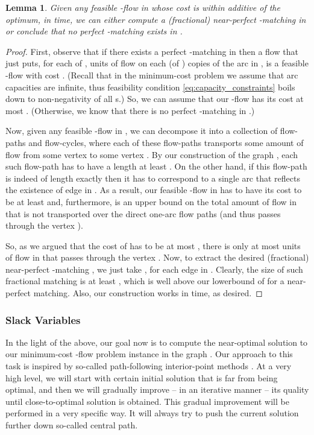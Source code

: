 \documentclass[11pt, letterpaper]{article}
\newtheorem{lemma}[theorem]{Lemma}
\begin{document}
\begin{lemma}\label{lem:mincost_to_matchings}
Given any feasible -flow  in  whose cost  is within additive  of the optimum, in  time, we can either compute a (fractional) near-perfect -matching  in  or conclude that no perfect -matching exists in . 
\end{lemma} 

\begin{proof}
First, observe that if there exists a perfect -matching  in  then a flow  that just puts, for each  of ,  units of flow on each (of ) copies of the arc  in , is a feasible -flow with cost . (Recall that in the minimum-cost problem we assume that arc capacities are infinite, thus feasibility condition \eqref{eq:capacity_constraints} boils down to non-negativity of all s.) So, we can assume that our -flow  has its cost  at most . (Otherwise, we know that there is no perfect -matching in .)

Now, given any feasible -flow in , we can decompose it into a collection of flow-paths and flow-cycles, where each of these flow-paths transports some amount of flow from some vertex  to some vertex . By our construction of the graph , each such flow-path has to have a length at least . On the other hand, if this flow-path is indeed of length exactly  then it has to correspond to a single arc  that reflects the existence of edge  in . As a result, our feasible -flow  in  has to have its cost  to be at least  and, furthermore,  is an upper bound on the total amount of flow in  that is not transported over the direct one-arc flow paths (and thus passes through the vertex ).  

So, as we argued that the cost of  has to be at most , there is only at most  units of flow in  that passes through the vertex . Now, to extract the desired (fractional) near-perfect -matching , we just take , for each edge  in . Clearly, the size of such fractional matching is at least , which is well above our lowerbound of  for a near-perfect matching. Also, our construction works in  time, as desired. 
\end{proof}

\subsubsection*{Slack Variables}

In the light of the above, our goal now is to compute the near-optimal solution to our minimum-cost -flow problem instance in the graph . Our approach to this task is inspired by so-called path-following interior-point methods \cite{Ye97,Wright97,BoydV04}. At a very high level, we will start with certain initial solution that is far from being optimal, and then we will gradually improve -- in an iterative manner -- its quality until close-to-optimal solution is obtained. This gradual improvement will be performed in a very specific way. It will always try to push the current solution further down so-called central path. 
\end{document}
